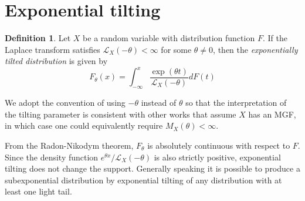 \documentclass{article}
\theoremstyle{definition}
\newtheorem{definition}{Definition}[section]
\begin{document}
\section{Exponential tilting}
\begin{definition}
\label{def:exp_tilt}
Let $X$ be a random variable with distribution function $F$. If the Laplace transform satisfies $\mathcal{L}_X(-\theta)<\infty$ for some $\theta\neq 0$, then the \textit{exponentially tilted distribution} is given by
\[F_\theta(x) = \int_{-\infty}^x \frac{\exp(\theta t)}{\mathcal{L}_X(-\theta)}dF(t)\]
\end{definition}
We adopt the convention of using $-\theta$ instead of $\theta$ so that the interpretation of the tilting parameter is consistent with other works that assume $X$ has an MGF, in which case one could equivalently require $M_X(\theta)<\infty$. 

From the Radon-Nikodym theorem, $F_\theta$ is absolutely continuous with respect to $F$. Since the density function $e^{\theta x}/\mathcal{L}_X(-\theta)$ is also strictly positive, exponential tilting does not change the support. Generally speaking it is possible to produce a subexponential distribution by exponential tilting of any distribution with at least one light tail.
\end{document}
